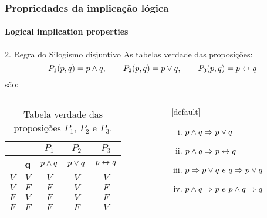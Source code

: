 %
\begin{frame}[t]
    \frametitle{Propriedades da implicação lógica}
    \framesubtitle{Logical implication properties}
    \begin{exampleblock}{2. Regra do Silogismo disjuntivo}
        As tabelas verdade das proposições:
        $$ P_1(p,q) = p \land q, \qquad  P_2(p,q) = p \lor q, \qquad P_3(p,q) = p \leftrightarrow q$$
        são:
    \end{exampleblock}
    \vspace{-4mm}
    \begin{columns}
        \begin{column}{0.5\textwidth}
            \small
            \begin{table}[]
                \caption{Tabela verdade das proposições $P_1$, $P_2$ e $P_3$.}
                \label{tab:exemple-31}
                \vspace{-2mm}
                \begin{tabular}{cc||c|c|c|}
                \cline{3-5}
                \multicolumn{1}{l}{}                                     & \multicolumn{1}{l|}{} & $P_1$    & $P_2$     & $P_3$     \\ \hline
                \rowcolor[HTML]{EFEFEF} 
                \multicolumn{1}{|c|}{\cellcolor[HTML]{EFEFEF}\textbf{p}} & \textbf{q}            & $p \land q$ & $p \lor q$ & $p \leftrightarrow q$ \\ \hline
                \multicolumn{1}{|c|}{$V$}                                & $V$                   & $V$      & $V$       & $V$       \\ \hline
                \multicolumn{1}{|c|}{$V$}                                & $F$                   & $F$      & $V$       & $F$       \\ \hline
                \multicolumn{1}{|c|}{$F$}                                & $V$                   & $F$      & $V$       & $F$       \\ \hline
                \multicolumn{1}{|c|}{$F$}                                & $F$                   & $F$      & $F$       & $V$       \\ \hline
                \end{tabular}
            \end{table}
        \end{column}
        \hspace{-6mm}
        \begin{column}{0.4\textwidth}
            [default]
            \begin{enumerate}[(i)]
                \item $p \land q \Rightarrow p \lor q$
                \item $p \land q \Rightarrow p \leftrightarrow q$
                \item $p \Rightarrow p \lor q ~e~ q \Rightarrow p \lor q$
                \item $p \land q \Rightarrow p ~e~ p \land q \Rightarrow q$
            \end{enumerate}
        \end{column}
    \end{columns}
\end{frame}